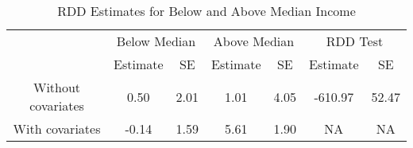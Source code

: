 \begin{table}

\caption{\label{tab:tab:rdd_results}RDD Estimates for Below and Above Median Income}
\centering
\begin{tabular}[t]{ccccccc}
\toprule
\multicolumn{1}{c}{ } & \multicolumn{2}{c}{Below Median} & \multicolumn{2}{c}{Above Median} & \multicolumn{2}{c}{RDD Test} \\
\cmidrule(l{3pt}r{3pt}){2-3} \cmidrule(l{3pt}r{3pt}){4-5} \cmidrule(l{3pt}r{3pt}){6-7}
 & Estimate & SE & Estimate & SE & Estimate & SE\\
\midrule
Without covariates & 0.50 & 2.01 & 1.01 & 4.05 & -610.97 & 52.47\\
With covariates & -0.14 & 1.59 & 5.61 & 1.90 & NA & NA\\
\bottomrule
\end{tabular}
\end{table}
